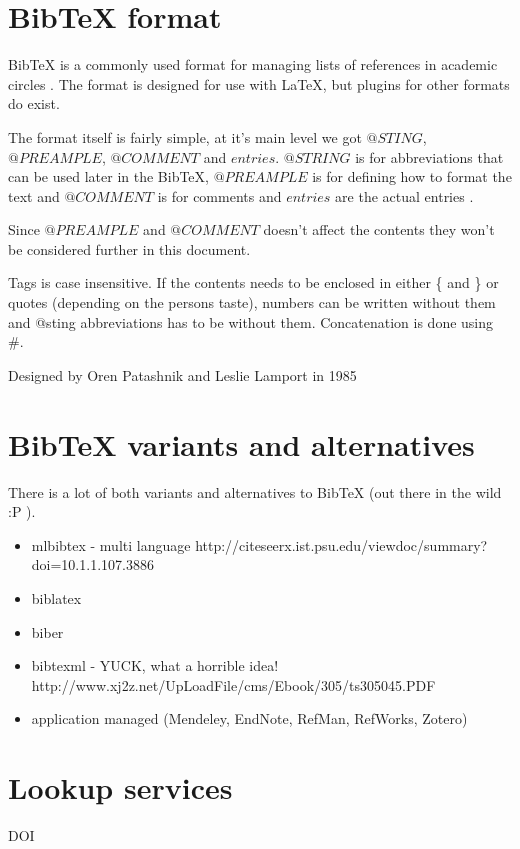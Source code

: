 \section{BibTeX format}
BibTeX is a commonly used format for managing lists of references in
academic circles .  The format is
designed for use with {\LaTeX}, but plugins for other formats do
exist. \autocite{bibtex_resource}

The format itself is fairly simple, at it's main level we got
$@STING$, $@PREAMPLE$, $@COMMENT$ and $entries$.  $@STRING$ is for
abbreviations that can be used later in the BibTeX, $@PREAMPLE$ is for
defining how to format the text and $@COMMENT$ is for comments and
$entries$ are the actual entries \autocite{bibtex_resource}.

Since $@PREAMPLE$ and $@COMMENT$ doesn't affect the contents they
won't be considered further in this document. 

Tags is case insensitive. If the contents needs to be enclosed in
either \{ and \} or quotes (depending on the persons taste), numbers
can be written without them and @sting abbreviations has to be without
them. Concatenation is done using \#.\autocite{bibtex_resource}

Designed by Oren Patashnik and Leslie Lamport in 1985





\section{BibTeX variants and alternatives}
There is a lot of both variants and alternatives to BibTeX (out there in the wild :P ).

\begin{itemize}
\item mlbibtex - multi language http://citeseerx.ist.psu.edu/viewdoc/summary?doi=10.1.1.107.3886
\item biblatex
\item biber
\item bibtexml - YUCK, what a horrible idea! http://www.xj2z.net/UpLoadFile/cms/Ebook/305/ts305045.PDF
\item application managed (Mendeley, EndNote, RefMan, RefWorks, Zotero)
\end{itemize}

\section{Lookup services}
DOI

